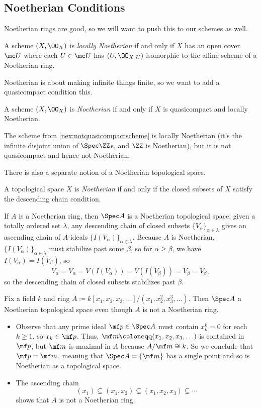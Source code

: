 \documentclass[../notes.tex]{subfiles}
\begin{document}
\subsection{Noetherian Conditions}
Noetherian rings are good, so we will want to push this to our schemes as well.
\begin{definition}
	A scheme $(X,\OO_X)$ is \textit{locally Noetherian} if and only if $X$ has an open cover $\mc U$ where each $U\in\mc U$ has $(U,\OO_X|_U)$ isomorphic to the affine scheme of a Noetherian ring.
\end{definition}
Noetherian is about making infinite things finite, so we want to add a quasicompact condition this.
\begin{definition}[Noetherian]
	A scheme $(X,\OO_X)$ is \textit{Noetherian} if and only if $X$ is quasicompact and locally Noetherian.
\end{definition}
\begin{example}
	The scheme from \autoref{nex:notquasicompactscheme} is locally Noetherian (it's the infinite disjoint union of $\Spec\ZZ$s, and $\ZZ$ is Noetherian), but it is not quasicompact and hence not Noetherian.
\end{example}
There is also a separate notion of a Noetherian topological space.
\begin{definition}[Noetherian]
	A topological space $X$ is \textit{Noetherian} if and only if the closed subsets of $X$ satisfy the descending chain condition.
\end{definition}
\begin{example} \label{ex:noetherianringisnoetherian}
	If $A$ is a Noetherian ring, then $\Spec A$ is a Noetherian topological space: given a totally ordered set $\lambda$, any descending chain of closed subsets $\{V_\alpha\}_{\alpha\in\lambda}$ gives an ascending chain of $A$-ideals $\{I(V_\alpha)\}_{\alpha\in\lambda}$. Because $A$ is Noetherian, $\{I(V_\alpha)\}_{\alpha\in\lambda}$ must stabilize past some $\beta$, so for $\alpha\ge\beta$, we have $I(V_\alpha)=I(V_\beta)$, so
	\[V_\alpha=\overline{V_\alpha}=V(I(V_\alpha))=V(I(V_\beta))=\overline{V_\beta}=V_\beta,\]
	so the descending chain of closed subsets stabilizes past $\beta$.
\end{example}
\begin{nex}
	Fix a field $k$ and ring $A\coloneqq k[x_1,x_2,x_3,\ldots]/\left(x_1,x_2^2,x_3^3,\ldots\right)$. Then $\Spec A$ a Noetherian topological space even though $A$ is not a Noetherian ring.
	\begin{itemize}
		\item Observe that any prime ideal $\mf p\in\Spec A$ must contain $x_k^k=0$ for each $k\ge1$, so $x_k\in\mf p$. Thus, $\mf m\coloneqq(x_1,x_2,x_3,\ldots)$ is contained in $\mf p$, but $\mf m$ is maximal in $A$ because $A/\mf m\cong k$. So we conclude that $\mf p=\mf m$, meaning that $\Spec A=\{\mf m\}$ has a single point and so is Noetherian as a topological space.
		\item The ascending chain
		\[(x_1)\subsetneq(x_1,x_2)\subsetneq(x_1,x_2,x_3)\subsetneq\cdots\]
		shows that $A$ is not a Noetherian ring.
	\end{itemize}
\end{nex}
\end{document}
